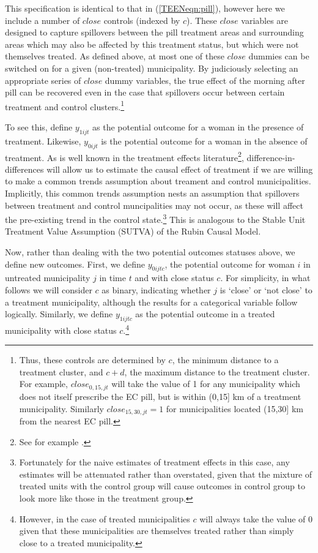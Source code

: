 This specification is identical to that in (\ref{TEENeqn:pill}), however here we 
include a number of $close$ controls (indexed by $c$).  These $close$ variables are 
designed to capture spillovers between the pill treatment areas and surrounding 
areas which may also be affected by this treatment status, but which were not 
themselves treated.  As defined above, at most one of these $close$ dummies can
be switched on for a given (non-treated) municipality.  By judiciously selecting 
an appropriate series of $close$ dummy variables, the true effect of the morning 
after pill can be recovered even in the case that spillovers occur between 
certain treatment and control clusters.\footnote{Thus, these controls are 
determined by $c$, the minimum distance to a treatment cluster, and $c+d$, 
the maximum distance to the treatment cluster. For example, $close_{0,15,jt}$ 
will take the value of 1 for any municipality which does not itself prescribe 
the EC pill, but is within (0,15] km of a treatment municipality.  Similarly 
$close_{15,30,jt}=1$ for municipalities located (15,30] km from the nearest
EC pill.}

To see this, define $y_{1ijt}$ as the potential outcome for a woman in the 
presence of treatment.  Likewise, $y_{0ijt}$ is the potential outcome for a 
woman in the absence of treatment.  As is well known in the treatment effects
literature\footnote{See for example \citet{CardKruger1994}.}, difference-in-%
differences will allow us to estimate the causal effect of treatment if we are 
willing to make a common trends assumption about treament and control 
municipalities.  Implicitly, this common trends assumption nests an assumption
that spillovers between treatment and control muncipalities may not occur, as 
these will affect the pre-existing trend in the control 
state.\footnote{Fortunately for the naive estimates of treatment effects in this 
case, any estimates will be attenuated rather than overstated, given that the 
mixture of treated units with the control group will cause outcomes in control 
group to look more like those in the treatment group.}  This is analogous to the 
Stable Unit Treatment Value Assumption (SUTVA) of the Rubin Causal Model.

Now, rather than dealing with the two potential outcomes statuses above, we
define new outcomes.  First, we define $y_{0ijtc}$, the potential outcome for 
woman $i$ in untreated municipality $j$ in time $t$ and with close status $c$.  
For simplicity, in what follows we will consider $c$ as binary, indicating whether
$j$ is `close' or `not close' to a treatment municipality, although the results
for a categorical variable follow logically.  Similarly, we define $y_{1ijtc}$
as the potential outcome in a treated municipality with close status 
$c$.\footnote{However, in the case of treated municipalities $c$ will always
take the value of 0 given that these municipalities are themselves treated rather
than simply close to a treated municipality.}

